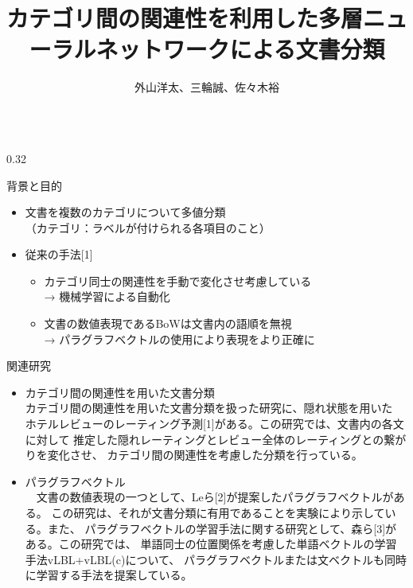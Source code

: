 \documentclass[10pt,unicode]{beamer}
\title{カテゴリ間の関連性を利用した多層ニューラルネットワークによる文書分類}
\author{外山洋太、三輪誠、佐々木裕}
\institute{豊田工業大学 工学部 先端工学基礎学科}
\date{}
\newcommand{\columnsize}{0.32}
\begin{document}
\begin{frame}{}
\maketitle
\vspace{-5ex} %
\begin{columns}[t]

\begin{column}{\columnsize\textwidth} %
  \begin{block}{背景と目的}
    \begin{itemize}
      \item 文書を複数のカテゴリについて多値分類 \\
      （カテゴリ：ラベルが付けられる各項目のこと）
      \item 従来の手法[1]
        \begin{itemize}
        \item カテゴリ同士の関連性を手動で変化させ考慮している \\
        → 機械学習による自動化
        \item 文書の数値表現であるBoWは文書内の語順を無視 \\
        → パラグラフベクトルの使用により表現をより正確に
        \end{itemize}
    \end{itemize}
  \end{block}

  \begin{block}{関連研究}
    \begin{itemize}
    \item カテゴリ間の関連性を用いた文書分類 \\
    カテゴリ間の関連性を用いた文書分類を扱った研究に、隠れ状態を用いた
    ホテルレビューのレーティング予測[1]がある。この研究では、文書内の各文に対して
    推定した隠れレーティングとレビュー全体のレーティングとの繋がりを変化させ、
    カテゴリ間の関連性を考慮した分類を行っている。
    \item パラグラフベクトル \\
    　文書の数値表現の一つとして、Leら[2]が提案したパラグラフベクトルがある。
    この研究は、それが文書分類に有用であることを実験により示している。また、
    パラグラフベクトルの学習手法に関する研究として、森ら[3]がある。この研究では、
    単語同士の位置関係を考慮した単語ベクトルの学習手法vLBL+vLBL(c)について、
    パラグラフベクトルまたは文ベクトルも同時に学習する手法を提案している。
    \end{itemize}
  \end{block}
\end{column} %


\end{columns}
\end{frame}
\end{document}

